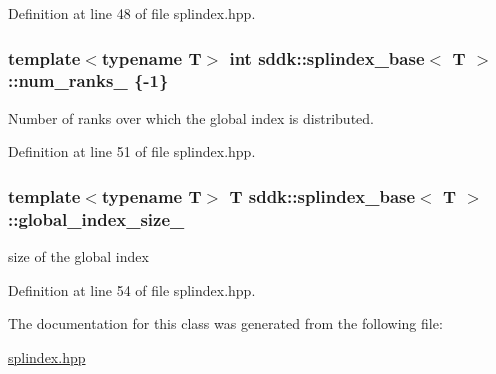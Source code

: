 Definition at line 48 of file splindex.\+hpp.

\hypertarget{classsddk_1_1splindex__base_a51bad9a1920fcca16c5fa6d4b27a315d}{}
\subsubsection[{num\+\_\+ranks\+\_\+}]{\setlength{\rightskip}{0pt plus 5cm}template$<$typename T$>$ int {\bf sddk\+::splindex\+\_\+base}$<$ T $>$\+::num\+\_\+ranks\+\_\+ \{-\/1\}\hspace{0.3cm}{\ttfamily [protected]}}\label{classsddk_1_1splindex__base_a51bad9a1920fcca16c5fa6d4b27a315d}


Number of ranks over which the global index is distributed. 



Definition at line 51 of file splindex.\+hpp.

\hypertarget{classsddk_1_1splindex__base_a39cf25f14bf77e1bbde2d3eedb729868}{}
\subsubsection[{global\+\_\+index\+\_\+size\+\_\+}]{\setlength{\rightskip}{0pt plus 5cm}template$<$typename T$>$ T {\bf sddk\+::splindex\+\_\+base}$<$ T $>$\+::global\+\_\+index\+\_\+size\+\_\+\hspace{0.3cm}{\ttfamily [protected]}}\label{classsddk_1_1splindex__base_a39cf25f14bf77e1bbde2d3eedb729868}


size of the global index 



Definition at line 54 of file splindex.\+hpp.



The documentation for this class was generated from the following file\+:\begin{DoxyCompactItemize}
\item 
\hyperlink{splindex_8hpp}{splindex.\+hpp}\end{DoxyCompactItemize}

